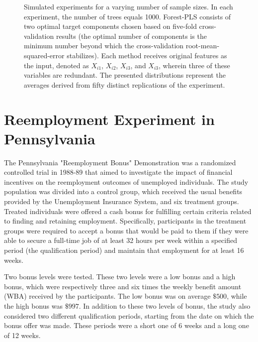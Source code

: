\documentclass[12pt]{article}
\begin{document}
\begin{figure}[H]
	\centering
    \quad
     \quad 
	\caption{Simulated experiments for a varying number of sample sizes. In each experiment, the number of trees equals 1000. Forest-PLS consists of two optimal target components chosen based on five-fold cross-validation results (the optimal number of components is the minimum number beyond which the cross-validation root-mean-squared-error stabilizes). Each method receives original features as the input, denoted as $X_{i1}$, $X_{i2}$, $X_{i3}$, and $X_{i3}$, wherein three of these variables are redundant. The presented distributions represent the averages derived from fifty distinct replications of the experiment.  } \label{fig_liv}
\end{figure}




\section{Reemployment Experiment in Pennsylvania}
The Pennsylvania "Reemployment Bonus" Demonstration was a randomized controlled trial in 1988-89 that aimed to investigate the impact of financial incentives on the reemployment outcomes of unemployed individuals. The study population was divided into a control group, which received the usual benefits provided by the Unemployment Insurance System, and six treatment groups. Treated individuals were offered a cash bonus for fulfilling certain criteria related to finding and retaining employment. Specifically, participants in the treatment groups were required to accept a bonus that would be paid to them if they were able to secure a full-time job of at least 32 hours per week within a specified period (the qualification period) and maintain that employment for at least 16 weeks.


Two bonus levels were tested. These two levels were a low bonus and a high bonus, which were respectively three and six times the weekly benefit amount (WBA) received by the participants. The low bonus was on average $\$500$, while the high bonus was $\$997$. In addition to these two levels of bonus, the study also considered two different qualification periods, starting from the date on which the bonus offer was made. These periods were a short one of 6 weeks and a long one of 12 weeks.
\end{document}
